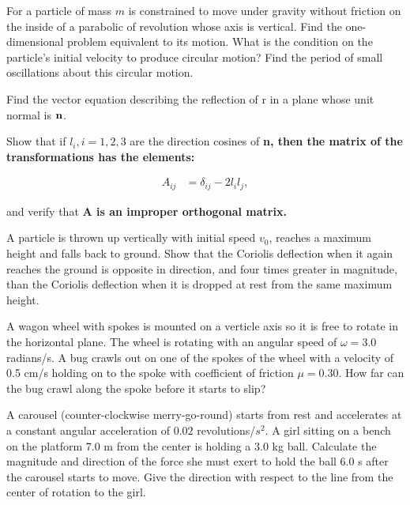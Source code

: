\documentclass{bachw}
\begin{document}
\solution{}
 
For a particle of mass $m$ is constrained to move under gravity without friction on the inside of a parabolic of revolution whose axis is vertical.  Find the one-dimensional problem equivalent to its motion.  What is the condition on the particle's initial velocity to produce circular motion?  Find the period of small oscillations about this circular motion.

\solution{}


\subproblem{}
Find the vector equation describing the reflection of r in a plane whose unit normal is $\bf{n}$.

\solution{}

\subproblem{}
Show that if $l_i, i = 1,2,3$ are the direction cosines of \bf{n}, then the matrix of the transformations has the elements:

\begin{align}
  A_{i j} &= \delta_{i j} - 2 l_i l_j,
\end{align}

and verify that \bf{A} is an improper orthogonal matrix.

\solution{}


A particle is thrown up vertically with initial speed $v_0$, reaches a maximum height and falls back to ground.  Show that the Coriolis deflection when it again reaches the ground is opposite in direction, and four times greater in magnitude, than the Coriolis deflection when it is dropped at rest from the same maximum height.

\solution{}

A wagon wheel with spokes is mounted on a verticle axis so it is free to rotate in the horizontal plane.  The wheel is rotating with an angular speed of $\omega = 3.0$ radians/s.  A bug crawls out on one of the spokes of the wheel with a velocity of 0.5 cm/s holding on to the spoke with coefficient of friction $\mu = 0.30$.  How far can the bug crawl along the spoke before it starts to slip?


\solution{}

A carousel (counter-clockwise merry-go-round) starts from rest and accelerates at a constant angular acceleration of $0.02$ revolutions/$s^2$.  A girl sitting on a bench on the platform 7.0 m from the center is holding a 3.0 kg ball.  Calculate the magnitude and direction of the force she must exert to hold the ball 6.0 s after the carousel starts to move.  Give the direction with respect to the line from the center of rotation to the girl.
\end{document}
